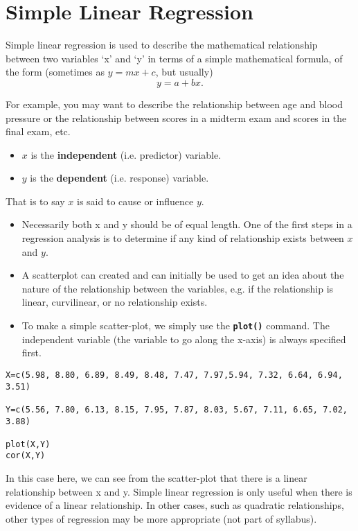 \documentclass[a4paper,12pt]{article}
\begin{document}
\newpage
\section{Simple Linear Regression}
Simple linear regression is used to describe the mathematical relationship between two variables ‘x’ and ‘y’ in terms of a simple mathematical formula, of the form  (sometimes as $y = mx+c$, but usually)\[ y= a+bx.\]

For example, you may want to describe the relationship between age and blood pressure or the relationship between scores in a midterm exam and scores in the final exam, etc.

\begin{itemize}
\item	$x$ is the \textbf{independent} (i.e. predictor) variable.
\item	$y$ is the \textbf{dependent} (i.e. response) variable.
\end{itemize}
That is to say $x$ is said to cause or influence $y$.

\begin{itemize}
\item Necessarily both x and y should be of equal length. One of the first steps in a regression analysis is to determine if any kind of relationship exists between $x$ and $y$.

\item A scatterplot can created and can initially be used to get an idea about the nature of the relationship between the variables, e.g. if the relationship is linear, curvilinear, or no relationship exists.

\item To make a simple scatter-plot, we simply use the \texttt{\textbf{plot()}} command. The independent variable (the variable to go along the x-axis) is always specified first.
\end{itemize}


\begin{framed}
\begin{verbatim}
X=c(5.98, 8.80, 6.89, 8.49, 8.48, 7.47, 7.97,5.94, 7.32, 6.64, 6.94, 3.51)

Y=c(5.56, 7.80, 6.13, 8.15, 7.95, 7.87, 8.03, 5.67, 7.11, 6.65, 7.02, 3.88)

plot(X,Y)
cor(X,Y)
\end{verbatim}
\end{framed}
In this case here, we can see from the scatter-plot that there is a linear relationship between x and y.
Simple linear regression is only useful when there is evidence of a linear relationship. In other cases, such as quadratic relationships, other types of regression may be more appropriate (not part of syllabus).
\end{document}
